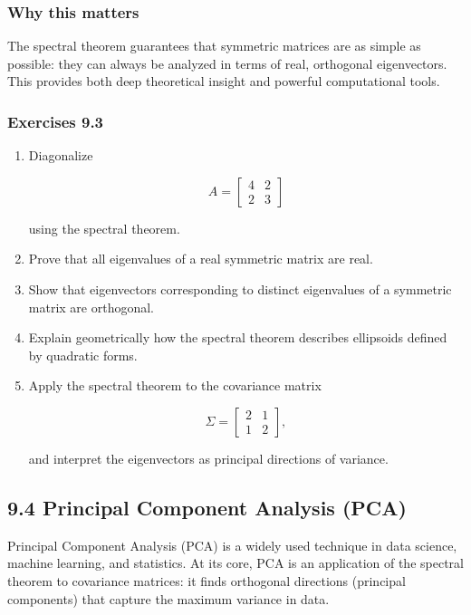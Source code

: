 \documentclass[
  12pt,
  a4paper,
]{article}
\begin{document}
\subsubsection{Why this matters}\label{why-this-matters-34}

The spectral theorem guarantees that symmetric matrices are as simple as
possible: they can always be analyzed in terms of real, orthogonal
eigenvectors. This provides both deep theoretical insight and powerful
computational tools.

\subsubsection{Exercises 9.3}\label{exercises-93}

\begin{enumerate}
\def\labelenumi{\arabic{enumi}.}
\item
  Diagonalize

  \[A = \begin{bmatrix} 4 & 2 \\ 2 & 3 \end{bmatrix}\]

  using the spectral theorem.
\item
  Prove that all eigenvalues of a real symmetric matrix are real.
\item
  Show that eigenvectors corresponding to distinct eigenvalues of a
  symmetric matrix are orthogonal.
\item
  Explain geometrically how the spectral theorem describes ellipsoids
  defined by quadratic forms.
\item
  Apply the spectral theorem to the covariance matrix

  \[\Sigma = \begin{bmatrix} 2 & 1 \\ 1 & 2 \end{bmatrix},\]

  and interpret the eigenvectors as principal directions of variance.
\end{enumerate}

\subsection{9.4 Principal Component Analysis
(PCA)}\label{94-principal-component-analysis-pca}

Principal Component Analysis (PCA) is a widely used technique in data
science, machine learning, and statistics. At its core, PCA is an
application of the spectral theorem to covariance matrices: it finds
orthogonal directions (principal components) that capture the maximum
variance in data.
\end{document}
